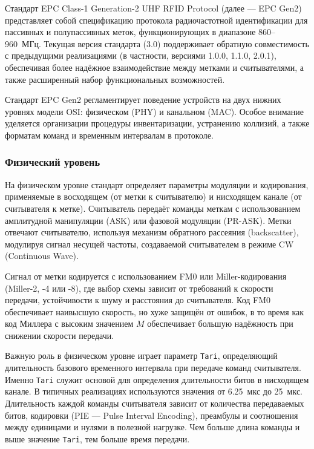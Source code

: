 \documentclass[12pt]{article}
\theoremstyle{definition}
\begin{document}
Стандарт EPC Class-1 Generation-2 UHF RFID Protocol (далее --- EPC Gen2) представляет собой спецификацию протокола радиочастотной идентификации для пассивных и полупассивных меток, функционирующих в диапазоне 860--960~МГц. Текущая версия стандарта (3.0) поддерживает обратную совместимость с предыдущими реализациями (в частности, версиями 1.0.0, 1.1.0, 2.0.1), обеспечивая более надёжное взаимодействие между метками и считывателями, а также расширенный набор функциональных возможностей.

Стандарт EPC Gen2 регламентирует поведение устройств на двух нижних уровнях модели OSI: физическом (PHY) и канальном (MAC). Особое внимание уделяется организации процедуры инвентаризации, устранению коллизий, а также форматам команд и временным интервалам в протоколе.

\subsubsection{Физический уровень}

На физическом уровне стандарт определяет параметры модуляции и кодирования, применяемые в восходящем (от метки к считывателю) и нисходящем канале (от считывателя к метке). Считыватель передаёт команды меткам с использованием амплитудной манипуляции (ASK) или фазовой модуляции (PR-ASK). Метки отвечают считывателю, используя механизм обратного рассеяния (backscatter), модулируя сигнал несущей частоты, создаваемой считывателем в режиме CW (Continuous Wave).

Сигнал от метки кодируется с использованием FM0 или Miller-кодирования (Miller-2, -4 или -8), где выбор схемы зависит от требований к скорости передачи, устойчивости к шуму и расстояния до считывателя. Код FM0 обеспечивает наивысшую скорость, но хуже защищён от ошибок, в то время как код Миллера с высоким значением $M$ обеспечивает большую надёжность при снижении скорости передачи.

Важную роль в физическом уровне играет параметр \texttt{Tari}, определяющий длительность базового временного интервала при передаче команд считывателя. Именно \texttt{Tari} служит основой для определения длительности битов в нисходящем канале. В типичных реализациях используются значения от 6.25~мкс до 25~мкс. Длительность каждой команды считывателя зависит от количества передаваемых битов, кодировки (PIE — Pulse Interval Encoding), преамбулы и соотношения между единицами и нулями в полезной нагрузке. Чем больше длина команды и выше значение \texttt{Tari}, тем больше время передачи.
\end{document}
